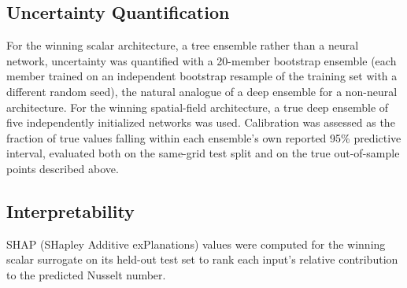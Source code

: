 \subsection{Uncertainty Quantification}
\label{subsec:uq}

For the winning scalar architecture, a tree ensemble rather than a neural network, uncertainty was quantified with a 20-member bootstrap ensemble (each member trained on an independent bootstrap resample of the training set with a different random seed), the natural analogue of a deep ensemble for a non-neural architecture. For the winning spatial-field architecture, a true deep ensemble of five independently initialized networks was used. Calibration was assessed as the fraction of true values falling within each ensemble's own reported 95\% predictive interval, evaluated both on the same-grid test split and on the true out-of-sample points described above.

\subsection{Interpretability}
\label{subsec:interp}

SHAP (SHapley Additive exPlanations) values were computed for the winning scalar surrogate on its held-out test set to rank each input's relative contribution to the predicted Nusselt number.
